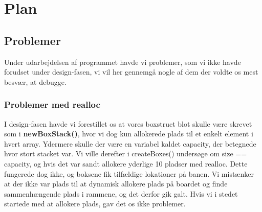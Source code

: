 \section{Plan}

\subsection{Problemer}
Under udarbejdelsen af programmet havde vi problemer, som vi ikke havde forudset under design-fasen, vi vil her gennemgå nogle af dem der voldte os mest besvær, at debugge.
\subsubsection{Problemer med realloc}
I design-fasen havde vi forestillet os at vores boxstruct blot skulle være skrevet som i \textbf{newBoxStack()}, hvor vi dog kun allokerede plads til et enkelt element i hvert array. Ydermere skulle der være en variabel kaldet capacity, der betegnede hvor stort stacket var. Vi ville derefter i createBoxes() undersøge om size == capacity, og hvis det var sandt allokere yderlige 10 pladser med realloc. Dette fungerede dog ikke, og boksene fik tilfældige lokationer på banen. Vi mistænker at der ikke var plads til at dynamisk allokere plads på boardet og finde sammenhængende plads i rammene, og det derfor gik galt. Hvis vi i stedet startede med at allokere plads, gav det os ikke problemer.




